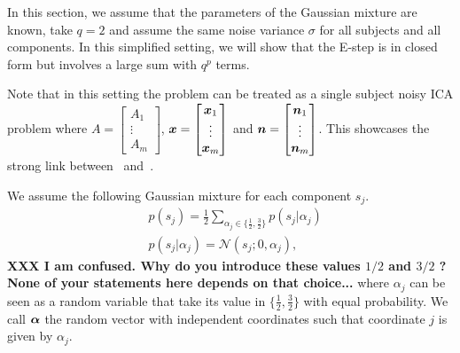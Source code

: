 In this section, we assume that the parameters of the Gaussian mixture are
known, take $q=2$ and assume the same noise variance $\sigma$ for all subjects and all
components. In this
simplified setting, we will show that the E-step is in closed form but involves
a large sum with $q^p$ terms.

Note that in this setting the problem can be treated as a single subject noisy
ICA problem where $A = \begin{bmatrix} A_1 \\ \vdots  \\ A_m \end{bmatrix}$,
$\boldsymbol{x} = \begin{bmatrix} \boldsymbol{x}_1 \\ \vdots  \\ \boldsymbol{x}_m \end{bmatrix}$ and $\boldsymbol{n}
= \begin{bmatrix} \boldsymbol{n}_1 \\ \vdots  \\ \boldsymbol{n}_m \end{bmatrix}$. This showcases the
strong link between~\cite{guo2008unified} and~\cite{moulines1997maximum}.

We assume the following Gaussian mixture for each component $s_j$.
\begin{align}
  &p(s_j) = \frac12 \sum_{\alpha_j \in \{\frac12, \frac32\}} p(s_j | \alpha_j) \\
  &p(s_j | \alpha_j) = \mathcal{N}( s_j; 0, \alpha_j),
\end{align}
\textbf{XXX I am confused. Why do you introduce these values $1/2$ and $3/2$ ? None of your statements here depends on that choice...}
where $\alpha_j$ can be seen as a random variable that take its value in $\{ \frac12,
\frac32 \}$  with equal probability. We call $\boldsymbol{\alpha}$ the random vector with
independent coordinates such that coordinate $j$ is given by $\alpha_j$.

